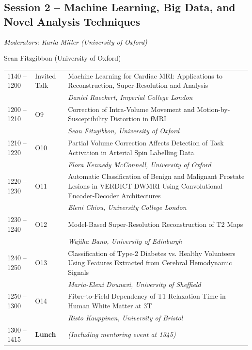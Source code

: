 \documentclass[a5paper,10pt,twoside,onecolumn,openany,helvetica,showtrims]{memoir}
\newlength{\JackBoxOne}
\newlength{\JackBoxTwo}
\newlength{\JackBoxThree}
\newlength{\LittleSkip}
\newcommand{\talkauthor}[1]{\small\emph{#1}}
\begin{document}
\subsection*{Session 2 -- Machine Learning, Big Data, and Novel Analysis Techniques}
\begin{flushright}
\itshape Moderators: Karla Miller (University of Oxford)  

Sean Fitzgibbon (University of Oxford)
\end{flushright}


\noindent\hspace{-0.75em}\begin{tabular}{p{\JackBoxOne}p{\JackBoxTwo}p{\JackBoxThree}}
1140 -- 1200 & Invited Talk & Machine Learning for Cardiac MRI: Applications to Reconstruction, Super-Resolution and Analysis \\ 
		&	& \talkauthor{Daniel Rueckert, Imperial College London} \\
1200 -- 1210 & O9 & Correction of Intra-Volume Movement and Motion-by-Susceptibility
Distortion in fMRI \\ 
		&	& \talkauthor{Sean Fitzgibbon, University of Oxford}	 \\
1210 -- 1220 & O10 & Partial Volume Correction Affects Detection of Task Activation in Arterial
Spin Labelling Data \\ 
		&	& \talkauthor{Flora Kennedy McConnell, University of Oxford} \\ 
1220 -- 1230 & O11 & Automatic Classification of Benign and Malignant Prostate Lesions in
VERDICT DWMRI Using Convolutional Encoder-Decoder Architectures \\ 
		&	& \talkauthor{Eleni Chiou, University College London}\\
1230 -- 1240 & O12 & Model-Based Super-Resolution Reconstruction of T2 Maps \\ 
		&	& \talkauthor{Wajiha Bano, University of Edinburgh} \\ 
1240 -- 1250 & O13 & Classification of Type-2 Diabetes vs. Healthy Volunteers Using Features
Extracted from Cerebral Hemodynamic Signals \\ 
		&	& \talkauthor{Maria-Eleni Dounavi, University of Sheffield} \\ 
1250 -- 1300 & O14 & Fibre-to-Field Dependency of T1 Relaxation Time in Human White
 Matter at 3T \\ 
 		& 	& \talkauthor{Risto Kauppinen, University of Bristol}\\[\LittleSkip]
 1300 -- 1415 & \textbf{Lunch} & \hfill\emph{(Including mentoring event at 1345)}
\end{tabular}
\end{document}
